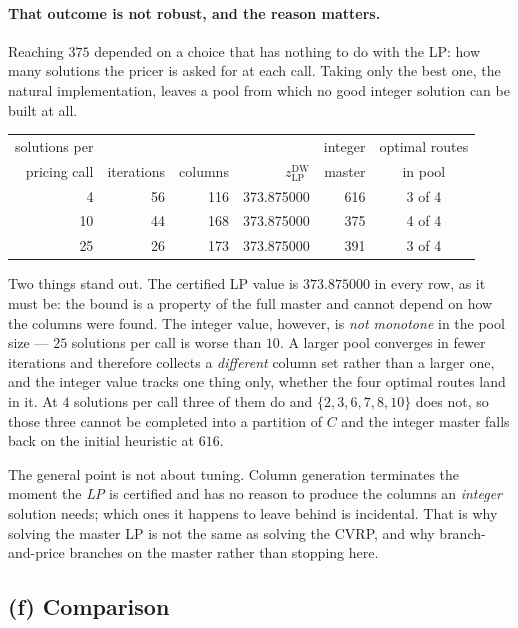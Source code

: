 \documentclass[11pt]{article}
\begin{document}
\paragraph{That outcome is not robust, and the reason matters.}
Reaching $375$ depended on a choice that has nothing to do with the
LP: how many solutions the pricer is asked for at each call. Taking
only the best one, the natural implementation, leaves a pool from
which no good integer solution can be built at all.

\begin{center}\small
\setlength{\tabcolsep}{6pt}
\begin{tabular}{@{}rrrrrc@{}}
\toprule
solutions per & & & & integer & optimal routes\\
pricing call & iterations & columns
  & $z^{\mathrm{DW}}_{\mathrm{LP}}$ & master & in pool\\
\midrule
 4 & 56 & 116 & 373.875000 & 616 & 3 of 4\\
10 & 44 & 168 & 373.875000 & 375 & 4 of 4\\
25 & 26 & 173 & 373.875000 & 391 & 3 of 4\\
\bottomrule
\end{tabular}
\end{center}

Two things stand out. The certified LP value is $373.875000$ in every
row, as it must be: the bound is a property of the full master and
cannot depend on how the columns were found. The integer value,
however, is \emph{not monotone} in the pool size --- $25$ solutions
per call is worse than $10$. A larger pool converges in fewer
iterations and therefore collects a \emph{different} column set rather
than a larger one, and the integer value tracks one thing only,
whether the four optimal routes land in it. At $4$ solutions per call
three of them do and $\{2,3,6,7,8,10\}$ does not, so those three
cannot be completed into a partition of $C$ and the integer master
falls back on the initial heuristic at $616$.

The general point is not about tuning. Column generation terminates
the moment the \emph{LP} is certified and has no reason to produce the
columns an \emph{integer} solution needs; which ones it happens to
leave behind is incidental. That is why solving the master LP is not
the same as solving the CVRP, and why branch-and-price branches on the
master rather than stopping here.

\subsection{(f) Comparison}
\end{document}
